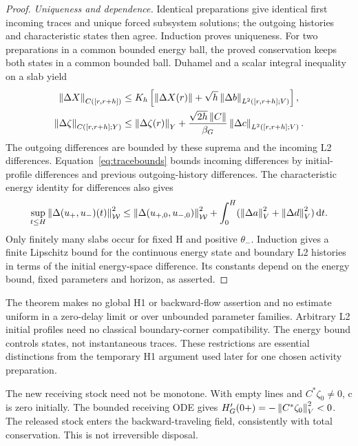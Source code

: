 \begin{proof}
\textit{Uniqueness and dependence.}
Identical preparations give identical first incoming traces and unique forced subsystem solutions; the outgoing histories and characteristic states then agree. Induction proves uniqueness. For two preparations in a common bounded energy ball, the proved conservation keeps both states in a common bounded ball. Duhamel and a scalar integral inequality on a slab yield
\begin{align}
\left\lVert\Delta X\right\rVert_{C([r,r+h])}&\le K_h\left[\left\lVert\Delta X(r)\right\rVert+\sqrt h\left\lVert\Delta b\right\rVert_{L^2([r,r+h];V)}\right],\notag\\
\left\lVert\Delta\zeta\right\rVert_{C([r,r+h];Y)}&\le\left\lVert\Delta\zeta(r)\right\rVert_Y
+\frac{\sqrt{2h}\left\lVert C\right\rVert}{\beta_G}\left\lVert\Delta c\right\rVert_{L^2([r,r+h];V)}.\label{eq:dependence}
\end{align}
The outgoing differences are bounded by these suprema and the incoming L2 differences. Equation~\eqref{eq:tracebounds} bounds incoming differences by initial-profile differences and previous outgoing-history differences. The characteristic energy identity for differences also gives
\begin{equation}\label{eq:lineDifference}
\sup_{t\le H}\left\lVert\Delta(u_+,u_-)(t)\right\rVert_{\mathcal W}^2
\le\left\lVert\Delta(u_{+,0},u_{-,0})\right\rVert_{\mathcal W}^2
+\int_0^H(\left\lVert\Delta a\right\rVert_V^2+\left\lVert\Delta d\right\rVert_V^2)\,\mathrm d t.
\end{equation}
Only finitely many slabs occur for fixed H and positive $\theta_-$. Induction gives a finite Lipschitz bound for the continuous energy state and boundary L2 histories in terms of the initial energy-space difference. Its constants depend on the energy bound, fixed parameters and horizon, as asserted.
\end{proof}

The theorem makes no global H1 or backward-flow assertion and no estimate uniform in a zero-delay limit or over unbounded parameter families. Arbitrary L2 initial profiles need no classical boundary-corner compatibility. The energy bound controls states, not instantaneous traces. These restrictions are essential distinctions from the temporary H1 argument used later for one chosen activity preparation.

\begin{remark}\label{rem:nonmonotone}
The new receiving stock need not be monotone. With empty lines and $C^*\zeta_0\ne0$, c is zero initially. The bounded receiving ODE gives
$H_G'(0+)=-\left\lVert C^*\zeta_0\right\rVert_V^2<0$.
The released stock enters the backward-traveling field, consistently with total conservation. This is not irreversible disposal.
\end{remark}
